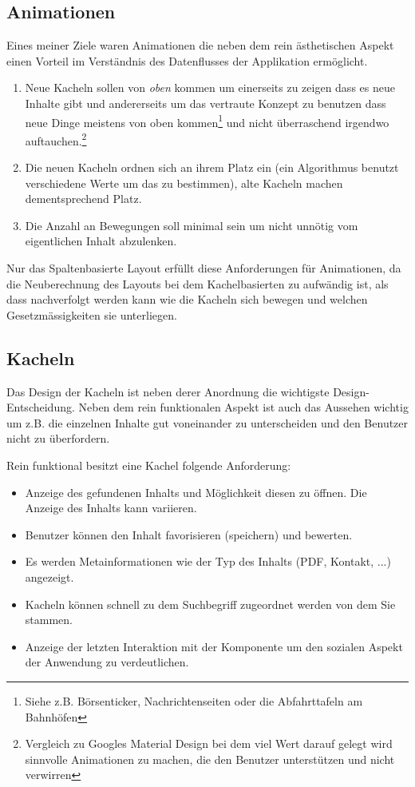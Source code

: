 \documentclass[12pt,twoside]{book}
\begin{document}
\begin{itemize}
\end{itemize}

\subsection{Animationen}

Eines meiner Ziele waren Animationen die neben dem rein ästhetischen Aspekt einen Vorteil im Verständnis des Datenflusses der Applikation ermöglicht.

\begin{enumerate}
  \item Neue Kacheln sollen von \textit{oben} kommen um einerseits zu zeigen dass es neue Inhalte gibt und andererseits um das vertraute Konzept zu benutzen dass neue Dinge meistens von oben kommen\footnote{Siehe z.B. Börsenticker, Nachrichtenseiten oder die Abfahrttafeln am Bahnhöfen} und nicht überraschend irgendwo auftauchen.\footnote{Vergleich zu Googles Material Design bei dem viel Wert darauf gelegt wird sinnvolle Animationen zu machen, die den Benutzer unterstützen und nicht verwirren}
  \item Die neuen Kacheln ordnen sich an ihrem Platz ein (ein Algorithmus benutzt verschiedene Werte um das zu bestimmen), alte Kacheln machen dementsprechend Platz.
  \item Die Anzahl an Bewegungen soll minimal sein um nicht unnötig vom eigentlichen Inhalt abzulenken.
\end{enumerate}

Nur das Spaltenbasierte Layout erfüllt diese Anforderungen für Animationen, da die Neuberechnung des Layouts bei dem Kachelbasierten zu aufwändig ist, als dass nachverfolgt werden kann wie die Kacheln sich bewegen und welchen Gesetzmässigkeiten sie unterliegen.

\subsection{Kacheln}

Das Design der Kacheln ist neben derer Anordnung die wichtigste Design-Entscheidung. Neben dem rein funktionalen Aspekt ist auch das Aussehen wichtig um z.B. die einzelnen Inhalte gut voneinander zu unterscheiden und den Benutzer nicht zu überfordern.

Rein funktional besitzt eine Kachel folgende Anforderung:

\begin{itemize}
  \item Anzeige des gefundenen Inhalts und Möglichkeit diesen zu öffnen. Die Anzeige des Inhalts kann variieren.
  \item Benutzer können den Inhalt favorisieren (speichern) und bewerten.
  \item Es werden Metainformationen wie der Typ des Inhalts (PDF, Kontakt, ...) angezeigt.
  \item Kacheln können schnell zu dem Suchbegriff zugeordnet werden von dem Sie stammen.
  \item Anzeige der letzten Interaktion mit der Komponente um den sozialen Aspekt der Anwendung zu verdeutlichen.
\end{itemize}
\end{document}
